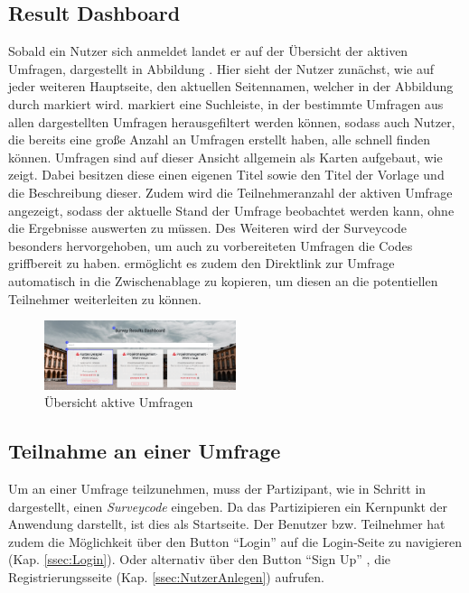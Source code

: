 \subsection{Result Dashboard}
\label{ssec:ResultDashboard}

Sobald ein Nutzer sich anmeldet landet er auf der Übersicht der aktiven Umfragen, dargestellt in Abbildung .
Hier sieht der Nutzer zunächst, wie auf jeder weiteren Hauptseite, den aktuellen Seitennamen, welcher in der Abbildung durch \desOne markiert wird.
\desTwo markiert eine Suchleiste, in der bestimmte Umfragen aus allen dargestellten Umfragen herausgefiltert werden können, sodass auch Nutzer, die bereits eine große Anzahl an Umfragen erstellt haben, alle schnell finden können.
Umfragen sind auf dieser Ansicht allgemein als Karten aufgebaut, wie \desThree zeigt.
Dabei besitzen diese einen eigenen Titel sowie den Titel der Vorlage und die Beschreibung dieser.
Zudem wird die Teilnehmeranzahl der aktiven Umfrage angezeigt, sodass der aktuelle Stand der Umfrage beobachtet werden kann, ohne die Ergebnisse auswerten zu müssen.
Des Weiteren wird der Surveycode besonders hervorgehoben, um auch zu vorbereiteten Umfragen die Codes griffbereit zu haben.
\faClipboard\xspace ermöglicht es zudem den Direktlink zur Umfrage automatisch in die Zwischenablage zu kopieren, um diesen an die potentiellen Teilnehmer weiterleiten zu können.

\begin{figure}[H]
	\centering
	\includegraphics[width=0.5\textwidth, keepaspectratio]{img/guide/ResultDashboard.png}
	\captionsetup{justification=centering, format=plain}
	\caption[Übersicht aktive Umfragen]{Übersicht aktive Umfragen \\\quelleScreenshot}
	\label{fig:ResultDashboard}
\end{figure}


\subsection{Teilnahme an einer Umfrage}
\label{ssec:TeilnahmeAnEinerUmfrage}

Um an einer Umfrage teilzunehmen, muss der Partizipant, wie in Schritt \desOne in \abb {} dargestellt, einen \emph{Surveycode} eingeben.
Da das Partizipieren ein Kernpunkt der Anwendung darstellt, ist dies als Startseite.
Der Benutzer bzw. Teilnehmer hat zudem die Möglichkeit über den Button \enquote{Login} \desTwo auf die Login-Seite zu navigieren (Kap. \vref{ssec:Login}). 
Oder alternativ über den Button \enquote{Sign Up} \desThree, die Registrierungsseite (Kap. \vref{ssec:NutzerAnlegen}) aufrufen.


